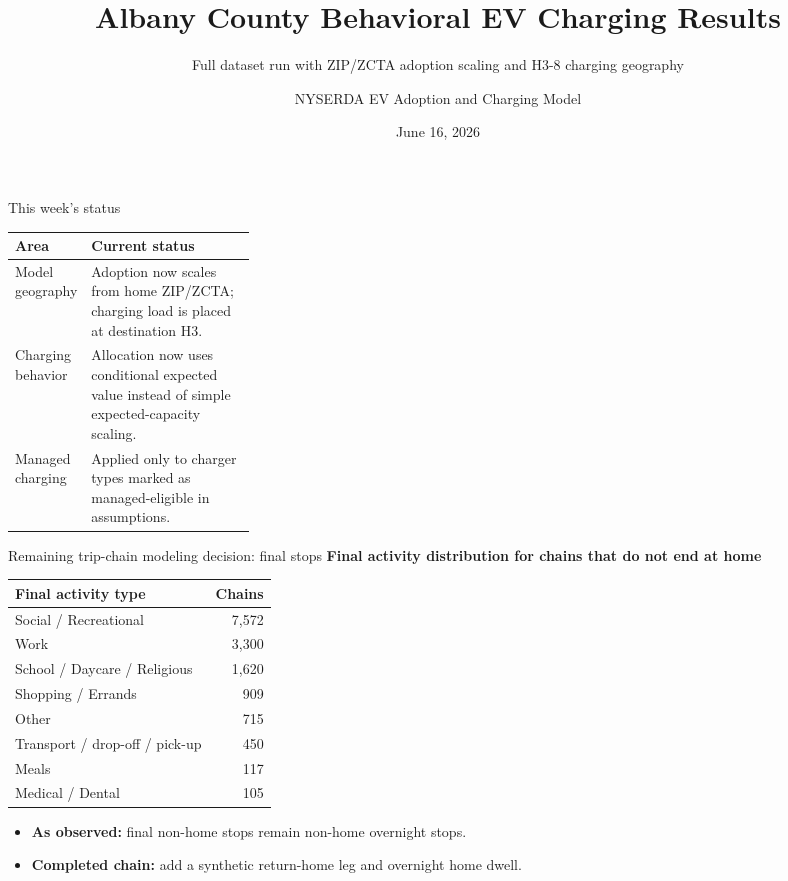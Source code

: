 \documentclass[aspectratio=169]{beamer}
\title[Albany EV Charging Results]{Albany County Behavioral EV Charging Results}
\subtitle{Full dataset run with ZIP/ZCTA adoption scaling and H3-8 charging geography}
\author{NYSERDA EV Adoption and Charging Model}
\date{June 16, 2026}
\begin{document}
\begin{frame}
  \titlepage
\end{frame}

\begin{frame}{This week's status}
\small
\begin{tabularx}{\linewidth}{p{0.28\linewidth}Y}
\toprule
\textbf{Area} & \textbf{Current status} \\
\midrule
Model geography & Adoption now scales from home ZIP/ZCTA; charging load is placed at destination H3. \\
Charging behavior & Allocation now uses conditional expected value instead of simple expected-capacity scaling. \\
Managed charging & Applied only to charger types marked as managed-eligible in assumptions. \\
\bottomrule
\end{tabularx}
\end{frame}

\begin{frame}{Remaining trip-chain modeling decision: final stops}
\small
\textbf{Final activity distribution for chains that do not end at home}

\vspace{0.4em}
\begin{tabular}{lr}
\toprule
\textbf{Final activity type} & \textbf{Chains} \\
\midrule
Social / Recreational & 7,572 \\
Work & 3,300 \\
School / Daycare / Religious & 1,620 \\
Shopping / Errands & 909 \\
Other & 715 \\
Transport / drop-off / pick-up & 450 \\
Meals & 117 \\
Medical / Dental & 105 \\
\bottomrule
\end{tabular}

\begin{itemize}
  \item \textbf{As observed:} final non-home stops remain non-home overnight stops.
  \item \textbf{Completed chain:} add a synthetic return-home leg and overnight home dwell.
\end{itemize}
\end{frame}
\end{document}
